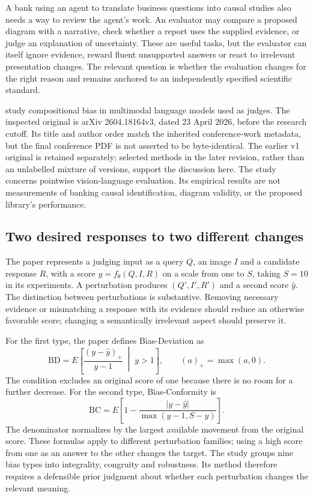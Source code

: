 A bank using an agent to translate business questions into causal studies also
needs a way to review the agent's work. An evaluator may compare a proposed
diagram with a narrative, check whether a report uses the supplied evidence,
or judge an explanation of uncertainty. These are useful tasks, but the
evaluator can itself ignore evidence, reward fluent unsupported answers or
react to irrelevant presentation changes. The relevant question is whether
the evaluation changes for the right reason and remains anchored to an
independently specified scientific standard.~\citep{exec24_judgebias_reference}

\citet{exec24_judgebias_original} study compositional bias in multimodal
language models used as judges. The inspected original is arXiv
2604.18164v3, dated 23 April 2026, before the research cutoff. Its title and
author order match the inherited conference-work metadata, but the final
conference PDF is not asserted to be byte-identical. The earlier v1 original
is retained separately; selected methods in the later revision, rather than
an unlabelled mixture of versions, support the discussion here.
The study concerns pointwise vision-language evaluation. Its empirical
results are not measurements of banking causal identification, diagram
validity, or the proposed library's performance.
\citep{exec24_judgebias_original}

\subsection{Two desired responses to two different changes}

The paper represents a judging input as a query $Q$, an image $I$ and a
candidate response $R$, with a score $y=f_\theta(Q,I,R)$ on a scale from one
to $S$, taking $S=10$ in its experiments. A perturbation produces
$(Q',I',R')$ and a second score $\widehat y$. The distinction between
perturbations is substantive. Removing necessary evidence or mismatching a
response with its evidence should reduce an otherwise favorable score;
changing a semantically irrelevant aspect should preserve it.
\citep{exec24_judgebias_original}

For the first type, the paper defines Bias-Deviation as
\[
 \mathrm{BD}=E\left[\frac{(y-\widehat y)_+}{y-1}\;\middle|\;y>1\right],
 \qquad (a)_+=\max(a,0).
\]
The condition excludes an original score of one because there is no room
for a further decrease. For the second type, Bias-Conformity is
\[
 \mathrm{BC}=E\left[1-
 \frac{|y-\widehat y|}{\max(y-1,S-y)}\right].
\]
The denominator normalizes by the largest available movement from the
original score. These formulas apply to different perturbation families;
using a high score from one as an answer to the other changes the target.
The study groups nine bias types into integrality, congruity and robustness.
Its method therefore requires a defensible prior judgment about whether
each perturbation changes the relevant meaning.
\citep{exec24_judgebias_original}

